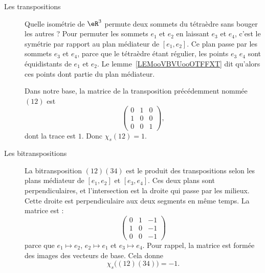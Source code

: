 \begin{description}
    \item[Les transpositions]

        Quelle isométrie de $\eR^3$ permute deux sommets du tétraèdre sans bouger les autres ? Pour permuter les sommets \( e_1\) et \( e_2\) en laissant \( e_3\) et \( e_4\), c'est le symétrie par rapport au plan médiateur de \( [e_1,e_2]\). Ce plan passe par les sommets \( e_3\) et \( e_4\), parce que le tétraèdre étant régulier, les points \( e_3\) \( e_4\) sont équidistants de \( e_1\) et \( e_2\). Le lemme~\ref{LEMooVBVUooOTFFXT} dit qu'alors ces points dont partie du plan médiateur.

        Dans notre base, la matrice de la transposition précédemment nommée \( (12)\) est
        \begin{equation}
            \begin{pmatrix}
                0    &   1    &   0    \\
                1    &   0    &   0    \\
                0    &   0    &   1
            \end{pmatrix},
        \end{equation}
        dont la trace est \( 1\). Donc \( \chi_s(12)=1\).

    \item[Les bitranspositions]

        La bitransposition \( (12)(34)\) est le produit des transpositions selon les plans médiateur de \( [e_1,e_2]\) et \( [e_3,e_4]\). Ces deux plans sont perpendiculaires, et l'intersection est la droite qui passe par les milieux. Cette droite est perpendiculaire aux deux segments en même temps. La matrice est :
        \begin{equation}
            \begin{pmatrix}
                0    &    1   &   -1    \\
                1    &   0    &   -1    \\
                0    &   0    &   -1
            \end{pmatrix}
        \end{equation}
        parce que \( e_1\mapsto e_2\), \( e_2\mapsto e_1\) et \( e_3\mapsto e_4\). Pour rappel, la matrice est formée des images des vecteurs de base. Cela donne
        \begin{equation}
            \chi_s\big( (12)(34) \big)=-1.
        \end{equation}


\end{description}
